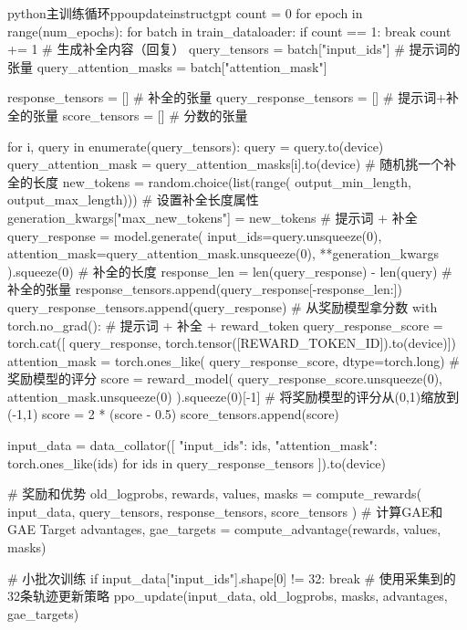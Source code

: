 \documentclass[lang=cn,newtx,10pt,scheme=chinese]{elegantbook}
\begin{document}
\begin{codebox}{python}{主训练循环}{ppoupdateinstructgpt}
count = 0
for epoch in range(num_epochs):
    for batch in train_dataloader:
        if count == 1:
            break
        count += 1
        # 生成补全内容（回复）
        query_tensors = batch["input_ids"]  # 提示词的张量
        query_attention_masks = batch["attention_mask"]

        response_tensors = []  # 补全的张量
        query_response_tensors = []  # 提示词+补全的张量
        score_tensors = []  # 分数的张量

        for i, query in enumerate(query_tensors):
            query = query.to(device)
            query_attention_mask = query_attention_masks[i].to(device)
            # 随机挑一个补全的长度
            new_tokens = random.choice(list(range(
                output_min_length,
                output_max_length)))
            # 设置补全长度属性
            generation_kwargs["max_new_tokens"] = new_tokens
            # 提示词 + 补全
            query_response = model.generate(
                input_ids=query.unsqueeze(0),
                attention_mask=query_attention_mask.unsqueeze(0),
                **generation_kwargs
            ).squeeze(0)
            # 补全的长度
            response_len = len(query_response) - len(query)
            # 补全的张量
            response_tensors.append(query_response[-response_len:])
            query_response_tensors.append(query_response)
            # 从奖励模型拿分数
            with torch.no_grad():
                # 提示词 + 补全 + reward_token
                query_response_score = torch.cat([
                    query_response,
                    torch.tensor([REWARD_TOKEN_ID]).to(device)])
                attention_mask = torch.ones_like(
                    query_response_score,
                    dtype=torch.long)
                # 奖励模型的评分
                score = reward_model(
                    query_response_score.unsqueeze(0),
                    attention_mask.unsqueeze(0)
                ).squeeze(0)[-1]
                # 将奖励模型的评分从(0,1)缩放到(-1,1)
                score = 2 * (score - 0.5)
            score_tensors.append(score)

        input_data = data_collator([
            {
                "input_ids": ids,
                "attention_mask": torch.ones_like(ids)
            }
            for ids in query_response_tensors
        ]).to(device)

        # 奖励和优势
        old_logprobs, rewards, values, masks = compute_rewards(
            input_data,
            query_tensors,
            response_tensors,
            score_tensors
        )
        # 计算GAE和GAE Target
        advantages, gae_targets = compute_advantage(rewards, values, masks)

        # 小批次训练
        if input_data["input_ids"].shape[0] != 32:
            break
        # 使用采集到的32条轨迹更新策略
        ppo_update(input_data, old_logprobs, masks, advantages, gae_targets)
\end{codebox}
\end{document}
